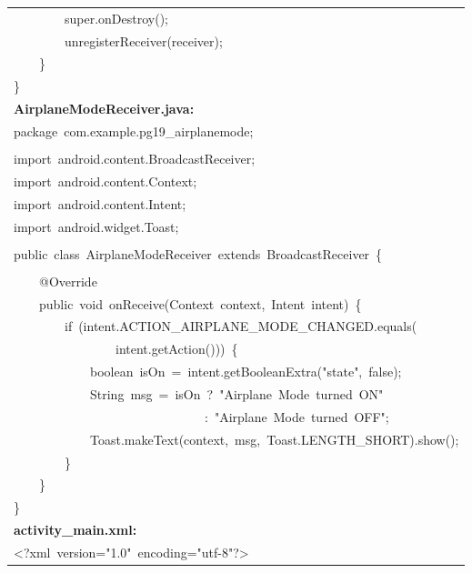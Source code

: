 \documentclass[a4paper,12pt]{article}
\begin{document}
\begin{longtable}{|p{}|}
{\ttfamily\small \ \ \ \ \ \ \ \ super.onDestroy();} \\
{\ttfamily\small \ \ \ \ \ \ \ \ unregisterReceiver(receiver);} \\
{\ttfamily\small \ \ \ \ \}} \\
{\ttfamily\small \}} \\
\hline
\rule{0pt}{13pt}\textbf{AirplaneModeReceiver.java:} \\
\hline
{\ttfamily\small package\ com.example.pg19\_airplanemode;} \\
\strut \\
{\ttfamily\small import\ android.content.BroadcastReceiver;} \\
{\ttfamily\small import\ android.content.Context;} \\
{\ttfamily\small import\ android.content.Intent;} \\
{\ttfamily\small import\ android.widget.Toast;} \\
\strut \\
{\ttfamily\small public\ class\ AirplaneModeReceiver\ extends\ BroadcastReceiver\ \{} \\
\strut \\
{\ttfamily\small \ \ \ \ @Override} \\
{\ttfamily\small \ \ \ \ public\ void\ onReceive(Context\ context,\ Intent\ intent)\ \{} \\
{\ttfamily\small \ \ \ \ \ \ \ \ if\ (intent.ACTION\_AIRPLANE\_MODE\_CHANGED.equals(} \\
{\ttfamily\small \ \ \ \ \ \ \ \ \ \ \ \ \ \ \ \ intent.getAction()))\ \{} \\
{\ttfamily\small \ \ \ \ \ \ \ \ \ \ \ \ boolean\ isOn\ =\ intent.getBooleanExtra("state",\ false);} \\
{\ttfamily\small \ \ \ \ \ \ \ \ \ \ \ \ String\ msg\ =\ isOn\ ?\ "Airplane\ Mode\ turned\ ON"\ } \\
{\ttfamily\small \ \ \ \ \ \ \ \ \ \ \ \ \ \ \ \ \ \ \ \ \ \ \ \ \ \ \ \ \ \ :\ "Airplane\ Mode\ turned\ OFF";} \\
{\ttfamily\small \ \ \ \ \ \ \ \ \ \ \ \ Toast.makeText(context,\ msg,\ Toast.LENGTH\_SHORT).show();} \\
{\ttfamily\small \ \ \ \ \ \ \ \ \}} \\
{\ttfamily\small \ \ \ \ \}} \\
{\ttfamily\small \}} \\
\hline
\rule{0pt}{13pt}\textbf{activity\_main.xml:} \\
\hline
{\ttfamily\small \textless{}?xml\ version="1.0"\ encoding="utf-8"?\textgreater{}} \\

\end{longtable}
\end{document}
